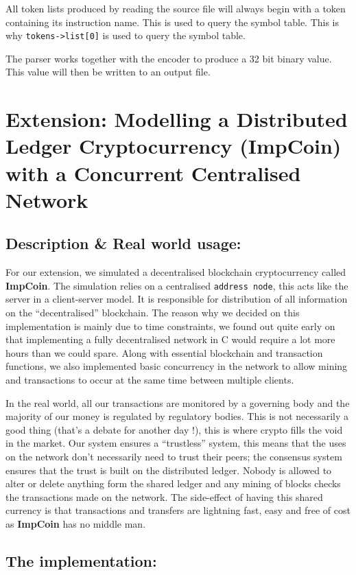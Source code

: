 \documentclass[a4paper]{article}
\begin{document}
All token lists produced by reading the source file will always begin with a token containing its instruction name. This is used to query the symbol table. This is why \verb|tokens->list[0]| is used to query the symbol table.

The parser works together with the encoder to produce a 32 bit binary value. This value will then be written to an output file.

\section{Extension: Modelling a Distributed Ledger Cryptocurrency (ImpCoin) with a Concurrent Centralised Network}
\subsection{Description \& Real world usage:}

For our extension, we simulated a decentralised blockchain cryptocurrency called \textbf{ImpCoin}. The simulation relies on a centralised \verb|address node|, this acts like the server in a client-server model. It is responsible for distribution of all information on the ``decentralised'' blockchain. The reason why we decided on this implementation is mainly due to time constraints, we found out quite early on that implementing a fully decentralised network in C would require a lot more hours than we could spare. Along with essential blockchain and transaction functions, we also implemented basic concurrency in the network to allow mining and transactions to occur at the same time between multiple clients.

In the real world, all our transactions are monitored by a governing body and the majority of our money is regulated by regulatory bodies. This is not necessarily a good thing (that's a debate for another day !), this is where crypto fills the void in the market. Our system ensures a ``trustless'' system, this means that the uses on the network don't necessarily need to trust their peers; the consensus system ensures that the trust is built on the distributed ledger. Nobody is allowed to alter or delete anything form the shared ledger and any mining of blocks checks the transactions made on the network. The side-effect of having this shared currency is that transactions and transfers are lightning fast, easy and free of cost as \textbf{ImpCoin} has no middle man.

\subsection{The implementation:}
\end{document}
